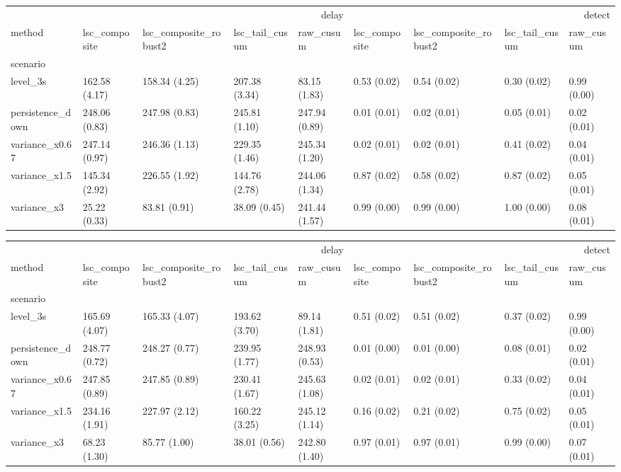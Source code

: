 \begin{tabular}{lllllllll}
\toprule
 & \multicolumn{4}{r}{delay} & \multicolumn{4}{r}{detect} \\
method & lsc_composite & lsc_composite_robust2 & lsc_tail_cusum & raw_cusum & lsc_composite & lsc_composite_robust2 & lsc_tail_cusum & raw_cusum \\
scenario &  &  &  &  &  &  &  &  \\
\midrule
level_3s & 162.58 (4.17) & 158.34 (4.25) & 207.38 (3.34) & 83.15 (1.83) & 0.53 (0.02) & 0.54 (0.02) & 0.30 (0.02) & 0.99 (0.00) \\
persistence_down & 248.06 (0.83) & 247.98 (0.83) & 245.81 (1.10) & 247.94 (0.89) & 0.01 (0.01) & 0.02 (0.01) & 0.05 (0.01) & 0.02 (0.01) \\
variance_x0.67 & 247.14 (0.97) & 246.36 (1.13) & 229.35 (1.46) & 245.34 (1.20) & 0.02 (0.01) & 0.02 (0.01) & 0.41 (0.02) & 0.04 (0.01) \\
variance_x1.5 & 145.34 (2.92) & 226.55 (1.92) & 144.76 (2.78) & 244.06 (1.34) & 0.87 (0.02) & 0.58 (0.02) & 0.87 (0.02) & 0.05 (0.01) \\
variance_x3 & 25.22 (0.33) & 83.81 (0.91) & 38.09 (0.45) & 241.44 (1.57) & 0.99 (0.00) & 0.99 (0.00) & 1.00 (0.00) & 0.08 (0.01) \\
\bottomrule
\end{tabular}

\begin{tabular}{lllllllll}
\toprule
 & \multicolumn{4}{r}{delay} & \multicolumn{4}{r}{detect} \\
method & lsc_composite & lsc_composite_robust2 & lsc_tail_cusum & raw_cusum & lsc_composite & lsc_composite_robust2 & lsc_tail_cusum & raw_cusum \\
scenario &  &  &  &  &  &  &  &  \\
\midrule
level_3s & 165.69 (4.07) & 165.33 (4.07) & 193.62 (3.70) & 89.14 (1.81) & 0.51 (0.02) & 0.51 (0.02) & 0.37 (0.02) & 0.99 (0.00) \\
persistence_down & 248.77 (0.72) & 248.27 (0.77) & 239.95 (1.77) & 248.93 (0.53) & 0.01 (0.00) & 0.01 (0.00) & 0.08 (0.01) & 0.02 (0.01) \\
variance_x0.67 & 247.85 (0.89) & 247.85 (0.89) & 230.41 (1.67) & 245.63 (1.08) & 0.02 (0.01) & 0.02 (0.01) & 0.33 (0.02) & 0.04 (0.01) \\
variance_x1.5 & 234.16 (1.91) & 227.97 (2.12) & 160.22 (3.25) & 245.12 (1.14) & 0.16 (0.02) & 0.21 (0.02) & 0.75 (0.02) & 0.05 (0.01) \\
variance_x3 & 68.23 (1.30) & 85.77 (1.00) & 38.01 (0.56) & 242.80 (1.40) & 0.97 (0.01) & 0.97 (0.01) & 0.99 (0.00) & 0.07 (0.01) \\
\bottomrule
\end{tabular}

